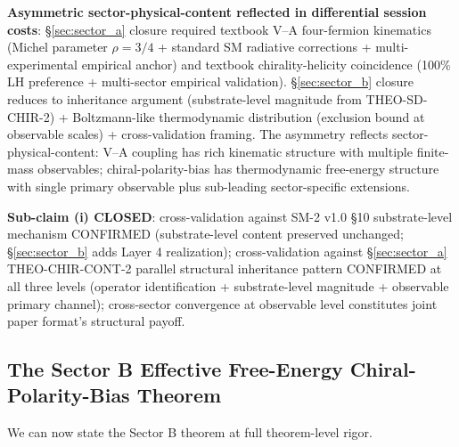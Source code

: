 \documentclass[11pt,letterpaper]{article}
\begin{document}
\textbf{Asymmetric sector-physical-content reflected in differential session costs}: §\ref{sec:sector_a} closure required textbook V--A four-fermion kinematics (Michel parameter $\rho = 3/4$ + standard SM radiative corrections + multi-experimental empirical anchor) and textbook chirality-helicity coincidence (100\% LH preference + multi-sector empirical validation). §\ref{sec:sector_b} closure reduces to inheritance argument (substrate-level magnitude from THEO-SD-CHIR-2) + Boltzmann-like thermodynamic distribution (exclusion bound at observable scales) + cross-validation framing. The asymmetry reflects sector-physical-content: V--A coupling has rich kinematic structure with multiple finite-mass observables; chiral-polarity-bias has thermodynamic free-energy structure with single primary observable plus sub-leading sector-specific extensions.

\textbf{Sub-claim (i) CLOSED}: cross-validation against SM-2 v1.0 §10 substrate-level mechanism CONFIRMED (substrate-level content preserved unchanged; §\ref{sec:sector_b} adds Layer 4 realization); cross-validation against §\ref{sec:sector_a} THEO-CHIR-CONT-2 parallel structural inheritance pattern CONFIRMED at all three levels (operator identification + substrate-level magnitude + observable primary channel); cross-sector convergence at observable level constitutes joint paper format's structural payoff.

\subsection{The Sector B Effective Free-Energy Chiral-Polarity-Bias Theorem}
\label{sec:theorem_sector_b}

We can now state the Sector B theorem at full theorem-level rigor.
\end{document}
